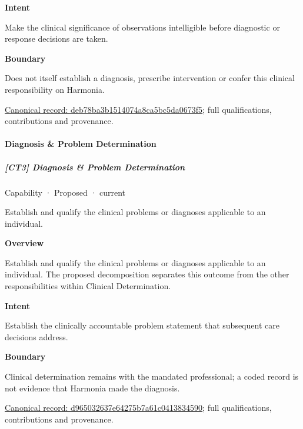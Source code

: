 \textbf{Intent}



Make the clinical significance of observations intelligible before diagnostic or response decisions are taken.



\textbf{Boundary}



Does not itself establish a diagnosis, prescribe intervention or confer this clinical responsibility on Harmonia.


{\footnotesize \href{../../../../continuum/strategy/capability/deb78ba3b1514074a8ca5bc5da0673f5.md}{Canonical record: deb78ba3b1514074a8ca5bc5da0673f5}; full qualifications, contributions and provenance.}\par
\paragraph{Diagnosis \& Problem Determination}

\subparagraph{[CT3] Diagnosis \& Problem Determination}

\label{element:d965032637e64275b7a61c0413834590}
{\small Capability · Proposed · current}\par

Establish and qualify the clinical problems or diagnoses applicable to an individual.



\textbf{Overview}



Establish and qualify the clinical problems or diagnoses applicable to an individual. The proposed decomposition separates this outcome from the other responsibilities within Clinical Determination.



\textbf{Intent}



Establish the clinically accountable problem statement that subsequent care decisions address.



\textbf{Boundary}



Clinical determination remains with the mandated professional; a coded record is not evidence that Harmonia made the diagnosis.


{\footnotesize \href{../../../../continuum/strategy/capability/d965032637e64275b7a61c0413834590.md}{Canonical record: d965032637e64275b7a61c0413834590}; full qualifications, contributions and provenance.}\par
